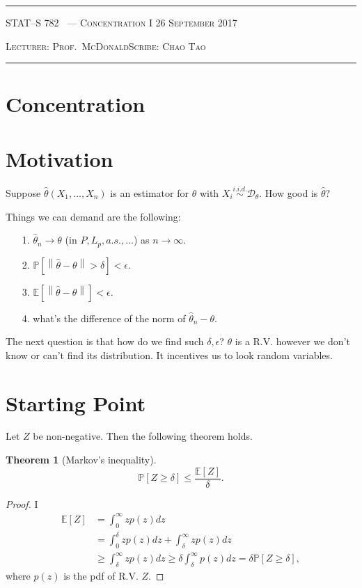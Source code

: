 \documentclass[10pt]{article}
\newcounter{lecnum}
\newtheorem{theorem}{Theorem}[lecnum]
\newcommand{\E}[1]{\mathbb{E}\!\left[#1\right]}
\renewcommand{\P}{\mathbb{P}}
\newcommand{\norm}[1]{\left\lVert #1 \right\rVert}
\newcommand{\lecturer}{Prof.\ McDonald}
\newcommand{\scribe}{Chao Tao}
\newcommand{\chtitle}{Concentration I}
\newcommand{\lecdate}{26 September 2017}
\begin{document}
\rule{6.5in}{1pt}

\textsc{STAT--S 782
        \hfill \thelecnum\ --- \chtitle
        \hfill \lecdate}

\textsc{Lecturer: \lecturer \hfill Scribe: \scribe}
\rule{6.5in}{1pt}

\section*{Concentration}

\section{Motivation}

Suppose $\widehat{\theta}(X_1, \dots, X_n)$ is an estimator for $\theta$ with $X_i \stackrel{i.i.d.}{\sim} \mathcal{D}_{\theta}$. How good is $\widehat{\theta}$?

Things we can demand are the following:
\begin{enumerate}
\item[1.] $\widehat{\theta}_n \rightarrow \theta$ (in $P, L_p, a.s., \dots$) as $n \rightarrow \infty$.
\item[2.] $\P\left[ \norm{\widehat{\theta} - \theta} > \delta \right] < \epsilon$.
\item[3.] $\E{ \norm{\widehat{\theta} - \theta} } < \epsilon$.
\item[4.] what's the difference of the norm of $\widehat{\theta}_n - \theta$.
\end{enumerate}

The next question is that how do we find such $\delta, \epsilon$? $\theta$ is a R.V. however we don't know or can't find its distribution. It incentives us to look random variables.

\section{Starting Point}

Let $Z$ be non-negative. Then the following theorem holds.

\begin{theorem}[Markov's inequality]
$$\P[ Z \geq \delta ] \leq \frac{ \E{Z} }{ \delta}.$$
\end{theorem}

\begin{proof}{I}
\begin{equation*}
\begin{array}{ll}
\E{Z} & = \int_{0}^{\infty} z p(z) dz \\
& = \int_{0}^{\delta} z p(z) dz + \int_{\delta}^{\infty} z p(z) dz \\
& \geq \int_{\delta}^{\infty} z p(z) dz \geq \delta \int_{\delta}^{\infty} p(z) dz = \delta \P[ Z \geq \delta],
\end{array} 
\end{equation*}
where $p(z)$ is the pdf of R.V. $Z$.
\end{proof}
\end{document}
